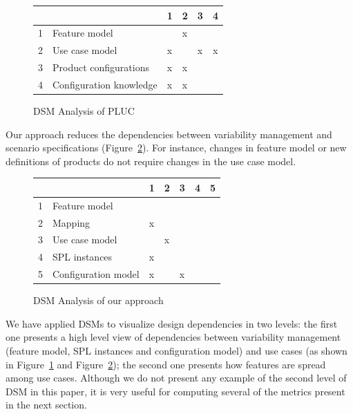 \documentclass[times, 11pt,twocolumn]{article}
\begin{document}
\begin{figure}[htb]
\centering
\begin{small}
\begin{tabular}{llllll} \hline
&  & 1 & 2 & 3 & 4 \\ \hline
1 & Feature model 			& 	& x	& 	&   	\\ 
2 & Use case model 		& x 	&  	&  x	&  x  \\ 
3 & Product configurations	& x 	& x	& 	&    	\\
4 & Configuration knowledge 	& x 	& x 	& 	&    	\\ \hline
\end{tabular}
\end{small}
 \caption{DSM Analysis of PLUC}
\label{dsm:pluc}
\end{figure}

Our approach reduces the dependencies between variability management and scenario
specifications (Figure~\ref{dsm:cc}). For instance, changes in feature model or
new definitions of products do not require changes in the use case model. 

\begin{figure}[h]
\centering
\begin{small}
\begin{tabular}{lllllll} \hline
& & 1 & 2 & 3 & 4 & 5 \\ \hline
1 & Feature model 		& 	& 	&      &  	&  	\\ 
2 & Mapping	 		& x	&	&	&	&  	\\
3 & Use case model 	&  	&  x	&  	&  	& 	\\
4 & SPL instances 		& x 	& 	& 	&   	& 	\\
5 & Configuration model 	& x 	&  	&  x	&  	& 	\\  \hline
\end{tabular}
\end{small}
 \caption{DSM Analysis of our approach}
\label{dsm:cc}
\end{figure}   

We have applied DSMs to visualize design dependencies in two levels: the first
one presents a high level view of dependencies between variability management
(feature model, SPL instances and configuration model) and use cases (as shown in
Figure~\ref{dsm:pluc} and Figure~\ref{dsm:cc}); the second one presents how
features are spread among use cases. Although we do not present any example of
the second level of DSM in this paper, it is very useful for computing several
of the metrics present in the next section.
\end{document}
